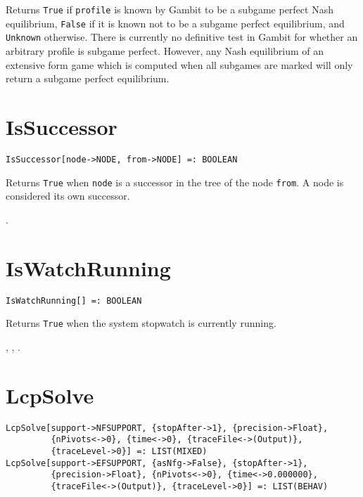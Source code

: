 \noindent
Returns \verb+True+ if \verb+profile+ is known by Gambit to be a
subgame perfect Nash equilibrium, \verb+False+ if it is known not to
be a subgame perfect equilibrium, and \verb+Unknown+ otherwise.  There
is currently no definitive test in Gambit for whether an arbitrary
profile is subgame perfect.  However, any Nash equilibrium of an
extensive form game which is computed when all subgames are marked
will only return a subgame perfect equilibrium. 


\section*{IsSuccessor}\label{PrimIsSuccessor}
\begin{verbatim}
IsSuccessor[node->NODE, from->NODE] =: BOOLEAN 
\end{verbatim}

\noindent
Returns \verb+True+ when \verb+node+ is a successor
in the tree of the node \verb+from+.  A node is considered its own successor.

\seealso {}.


\section*{IsWatchRunning}\label{PrimIsWatchRunning}
\begin{verbatim}
IsWatchRunning[] =: BOOLEAN 
\end{verbatim}

\noindent
Returns \verb+True+ when the system stopwatch is currently running.

\seealso {},
,
.




\section*{LcpSolve}\label{PrimLcpSolve}
\begin{verbatim}
LcpSolve[support->NFSUPPORT, {stopAfter->1}, {precision->Float}, 
         {nPivots<->0}, {time<->0}, {traceFile<->(Output)}, 
         {traceLevel->0}] =: LIST(MIXED) 
LcpSolve[support->EFSUPPORT, {asNfg->False}, {stopAfter->1}, 
         {precision->Float}, {nPivots<->0}, {time<->0.000000}, 
         {traceFile<->(Output)}, {traceLevel->0}] =: LIST(BEHAV) 
\end{verbatim}

